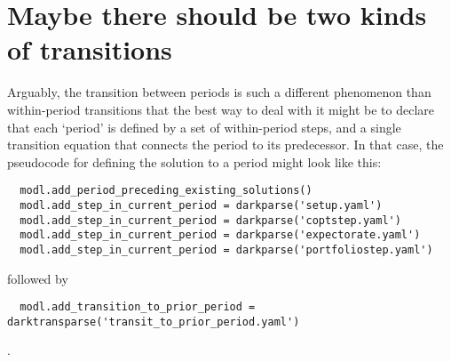 \documentclass[SolvingMicroDSOPs]{subfiles}
\begin{document}
\section{Maybe there should be two kinds of transitions}

Arguably, the transition between periods is such a different phenomenon than within-period transitions that the best way to deal with it might be to declare that each `period' is defined by a set of within-period steps, and a single transition equation that connects the period to its predecessor.  In that case, the pseudocode for defining the solution to a period might look like this:

\begin{verbatim}
  modl.add_period_preceding_existing_solutions()
  modl.add_step_in_current_period = darkparse('setup.yaml')
  modl.add_step_in_current_period = darkparse('coptstep.yaml')
  modl.add_step_in_current_period = darkparse('expectorate.yaml')
  modl.add_step_in_current_period = darkparse('portfoliostep.yaml')
\end{verbatim}
followed by
\begin{verbatim}
  modl.add_transition_to_prior_period = darktransparse('transit_to_prior_period.yaml')
\end{verbatim}
.

\onlyinsubfile{}
\end{document}
